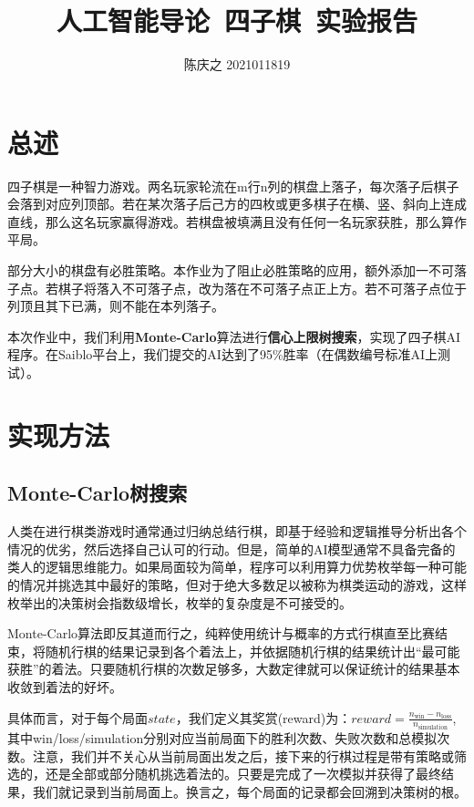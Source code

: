 \documentclass{article}
\title{\textbf{人工智能导论\ 四子棋\ 实验报告}}
\author{陈庆之 2021011819}
\begin{document}
	\maketitle
	
	\section{总述}
	
	四子棋是一种智力游戏。两名玩家轮流在m行n列的棋盘上落子，每次落子后棋子会落到对应列顶部。若在某次落子后己方的四枚或更多棋子在横、竖、斜向上连成直线，那么这名玩家赢得游戏。若棋盘被填满且没有任何一名玩家获胜，那么算作平局。
	
	部分大小的棋盘有必胜策略。本作业为了阻止必胜策略的应用，额外添加一不可落子点。若棋子将落入不可落子点，改为落在不可落子点正上方。若不可落子点位于列顶且其下已满，则不能在本列落子。
	
	本次作业中，我们利用\textbf{Monte-Carlo}算法进行\textbf{信心上限树搜索}，实现了四子棋AI程序。在Saiblo平台上，我们提交的AI达到了95\%胜率（在偶数编号标准AI上测试）。
	
	\section{实现方法}
	
	\subsection{Monte-Carlo树搜索}
	
	人类在进行棋类游戏时通常通过归纳总结行棋，即基于经验和逻辑推导分析出各个情况的优劣，然后选择自己认可的行动。但是，简单的AI模型通常不具备完备的类人的逻辑思维能力。如果局面较为简单，程序可以利用算力优势枚举每一种可能的情况并挑选其中最好的策略，但对于绝大多数足以被称为棋类运动的游戏，这样枚举出的决策树会指数级增长，枚举的复杂度是不可接受的。
	
	Monte-Carlo算法即反其道而行之，纯粹使用统计与概率的方式行棋直至比赛结束，将随机行棋的结果记录到各个着法上，并依据随机行棋的结果统计出“最可能获胜”的着法。只要随机行棋的次数足够多，大数定律就可以保证统计的结果基本收敛到着法的好坏。
	
	具体而言，对于每个局面$state$，我们定义其奖赏(reward)为：$reward = \frac{n_{\text{win}} - n_{\text{loss}}}{n_{\text{simulation}}}$, 其中win/loss/simulation分别对应当前局面下的胜利次数、失败次数和总模拟次数。注意，我们并不关心从当前局面出发之后，接下来的行棋过程是带有策略或筛选的，还是全部或部分随机挑选着法的。只要是完成了一次模拟并获得了最终结果，我们就记录到当前局面上。换言之，每个局面的记录都会回溯到决策树的根。
	
\end{document}

